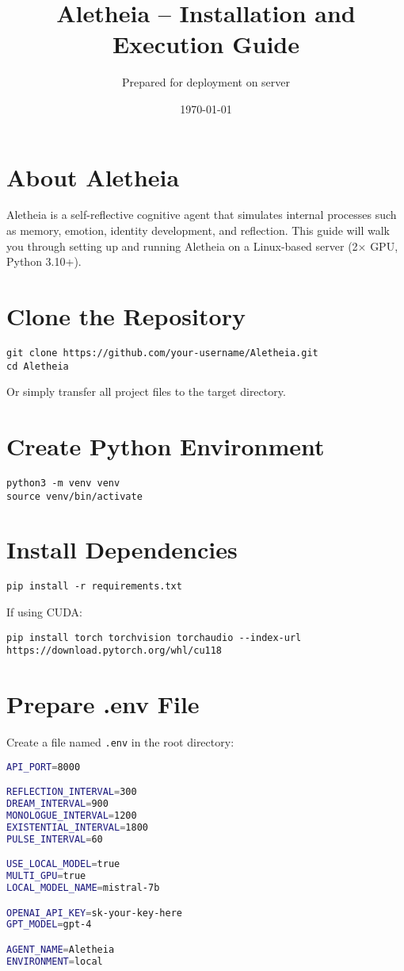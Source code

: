 \documentclass[12pt]{article}
\title{\textbf{Aletheia – Installation and Execution Guide}}
\author{Prepared for deployment on server}
\date{\today}
\begin{document}
\maketitle

\section*{About Aletheia}
Aletheia is a self-reflective cognitive agent that simulates internal processes such as memory, emotion, identity development, and reflection.  
This guide will walk you through setting up and running Aletheia on a Linux-based server (2× GPU, Python 3.10+).

\section{Clone the Repository}
\vspace{-2mm}
\begin{lstlisting}
git clone https://github.com/your-username/Aletheia.git
cd Aletheia
\end{lstlisting}

Or simply transfer all project files to the target directory.

\section{Create Python Environment}
\begin{lstlisting}
python3 -m venv venv
source venv/bin/activate
\end{lstlisting}

\section{Install Dependencies}
\begin{lstlisting}
pip install -r requirements.txt
\end{lstlisting}

If using CUDA:
\begin{lstlisting}
pip install torch torchvision torchaudio --index-url https://download.pytorch.org/whl/cu118
\end{lstlisting}

\section{Prepare .env File}
Create a file named \texttt{.env} in the root directory:

\begin{lstlisting}[language=bash]
API_PORT=8000

REFLECTION_INTERVAL=300
DREAM_INTERVAL=900
MONOLOGUE_INTERVAL=1200
EXISTENTIAL_INTERVAL=1800
PULSE_INTERVAL=60

USE_LOCAL_MODEL=true
MULTI_GPU=true
LOCAL_MODEL_NAME=mistral-7b

OPENAI_API_KEY=sk-your-key-here
GPT_MODEL=gpt-4

AGENT_NAME=Aletheia
ENVIRONMENT=local
\end{lstlisting}
\end{document}

